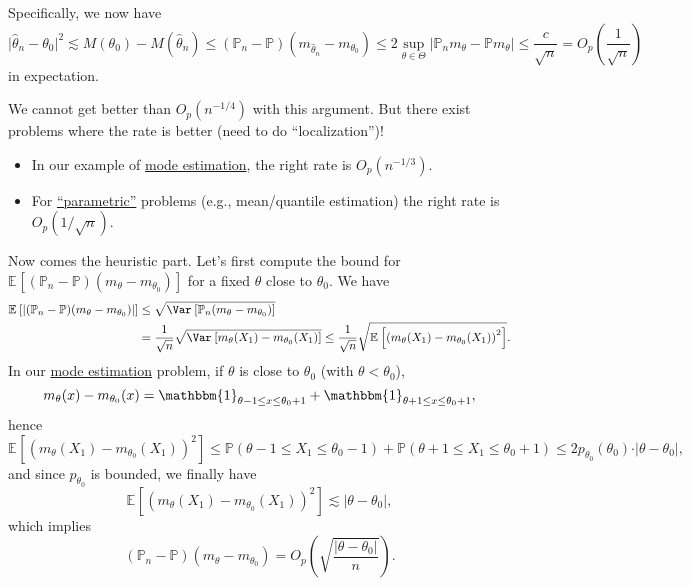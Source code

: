 Specifically, we now have
\[
	\vert \hat{\theta } _n - \theta _0 \vert ^2
	\lesssim M(\theta _0) - M(\hat{\theta } _n )
	\leq (\mathbb{P} _n - \mathbb{P} ) (m_{\hat{\theta } _n } - m_{\theta _0})
	\leq 2 \sup _{\theta \in \Theta } \vert \mathbb{P} _n m_\theta - \mathbb{P} m_\theta \vert
	\leq \frac{c}{\sqrt{n} }
	= O_p \left( \frac{1}{\sqrt{n} } \right)
\]
in expectation.

\begin{remark}
	We cannot get better than \(O_p(n^{-1 / 4})\) with this argument. But there exist problems where the rate is better (need to do ``localization'')!
	\begin{itemize}
		\item In our example of \hyperref[eg:mode-estimation]{mode estimation}, the right rate is \(O_p(n^{-1 / 3})\).
		\item For \hyperref[def:parametric]{``parametric''} problems (e.g., mean/quantile estimation) the right rate is \(O_p(1 / \sqrt{n} )\).
	\end{itemize}
\end{remark}

Now comes the heuristic part. Let's first compute the bound for \(\mathbb{E}_{}\left[(\mathbb{P} _n - \mathbb{P} ) (m_\theta - m_{\theta _0})\right] \) for a fixed \(\theta \) close to \(\theta _0\). We have
\[
	\begin{split}
		\mathbb{E}_{}\left[\vert (\mathbb{P} _n - \mathbb{P} ) (m_\theta - m_{\theta _0}) \vert \right]
		 & \leq \sqrt{\Var_{}\left[\mathbb{P} _n(m_\theta - m_{\theta _0}) \right] }              \\
		 & = \frac{1}{\sqrt{n} } \sqrt{\Var_{}\left[m_\theta (X_1) - m_{\theta _0}(X_1) \right] }
		\leq \frac{1}{\sqrt{n} } \sqrt{\mathbb{E}_{}\left[\left( m_\theta (X_1) - m_{\theta _0}(X_1) \right) ^2 \right] } .
	\end{split}
\]
In our \hyperref[eg:mode-estimation]{mode estimation} problem, if \(\theta \) is close to \(\theta _0\) (with \(\theta < \theta _0\)),
\[
	m_\theta (x) - m_{\theta _0}(x)
	= \mathbbm{1}_{\theta -1 \leq x \leq \theta _0 + 1} + \mathbbm{1}_{\theta +1 \leq x \leq \theta _0 + 1},
\]
hence
\[
	\mathbb{E}_{}\left[\left( m_\theta (X_1) - m_{\theta _0}(X_1) \right) ^2 \right]
	\leq \mathbb{P} (\theta -1 \leq X_1 \leq \theta _0 - 1) + \mathbb{P} (\theta +1 \leq X_1 \leq \theta _0 + 1)
	\leq 2 p_{\theta _0}(\theta _0) \cdot \vert \theta - \theta _0 \vert,
\]
and since \(p_{\theta _0}\) is bounded, we finally have
\[
	\mathbb{E}_{}\left[\left( m_\theta (X_1) - m_{\theta _0}(X_1) \right) ^2 \right]
	\lesssim \vert \theta - \theta _0 \vert,
\]
which implies
\[
	(\mathbb{P} _n - \mathbb{P} )(m_\theta - m_{\theta _0})
	= O_p \left( \sqrt{\frac{\vert \theta - \theta _0 \vert }{n}} \right) .
\]

